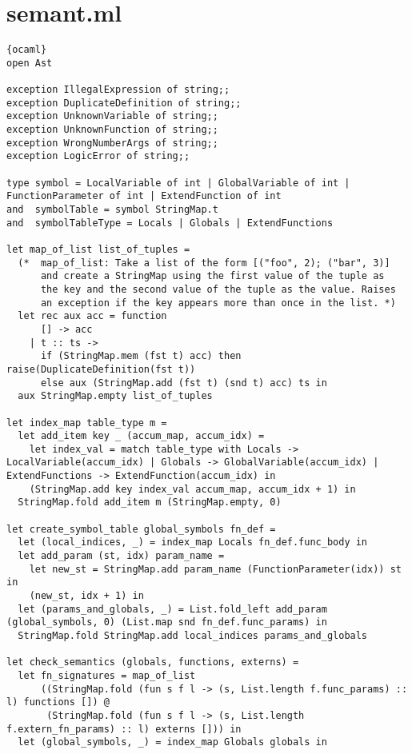\section{semant.ml}
\begin{lstlisting}{ocaml}
open Ast

exception IllegalExpression of string;;
exception DuplicateDefinition of string;;
exception UnknownVariable of string;;
exception UnknownFunction of string;;
exception WrongNumberArgs of string;;
exception LogicError of string;;

type symbol = LocalVariable of int | GlobalVariable of int | FunctionParameter of int | ExtendFunction of int
and  symbolTable = symbol StringMap.t
and  symbolTableType = Locals | Globals | ExtendFunctions

let map_of_list list_of_tuples =
  (*  map_of_list: Take a list of the form [("foo", 2); ("bar", 3)]
      and create a StringMap using the first value of the tuple as
      the key and the second value of the tuple as the value. Raises
      an exception if the key appears more than once in the list. *)
  let rec aux acc = function
      [] -> acc
    | t :: ts ->
      if (StringMap.mem (fst t) acc) then raise(DuplicateDefinition(fst t))
      else aux (StringMap.add (fst t) (snd t) acc) ts in
  aux StringMap.empty list_of_tuples

let index_map table_type m =
  let add_item key _ (accum_map, accum_idx) =
    let index_val = match table_type with Locals -> LocalVariable(accum_idx) | Globals -> GlobalVariable(accum_idx) | ExtendFunctions -> ExtendFunction(accum_idx) in
    (StringMap.add key index_val accum_map, accum_idx + 1) in
  StringMap.fold add_item m (StringMap.empty, 0)

let create_symbol_table global_symbols fn_def =
  let (local_indices, _) = index_map Locals fn_def.func_body in
  let add_param (st, idx) param_name =
    let new_st = StringMap.add param_name (FunctionParameter(idx)) st in
    (new_st, idx + 1) in
  let (params_and_globals, _) = List.fold_left add_param (global_symbols, 0) (List.map snd fn_def.func_params) in
  StringMap.fold StringMap.add local_indices params_and_globals

let check_semantics (globals, functions, externs) =
  let fn_signatures = map_of_list
      ((StringMap.fold (fun s f l -> (s, List.length f.func_params) :: l) functions []) @
       (StringMap.fold (fun s f l -> (s, List.length f.extern_fn_params) :: l) externs [])) in
  let (global_symbols, _) = index_map Globals globals in


\end{lstlisting}
